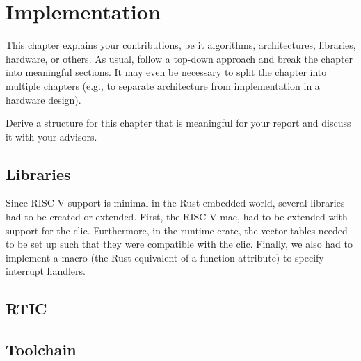 \chapter{Implementation}
\label{ch:implementation}

This chapter explains your contributions, be it algorithms, architectures, libraries, hardware, or others.
As usual, follow a top-down approach and break the chapter into meaningful sections.
It may even be necessary to split the chapter into multiple chapters (e.g., to separate architecture from implementation in a hardware design).

Derive a structure for this chapter that is meaningful for your report and discuss it with your advisors.

\section{Libraries}
\label{sec:libraries}
Since RISC-V support is minimal in the Rust embedded world, several libraries had to be created or extended.
First, the RISC-V \gls{mac}, had to be extended with support for the \gls{clic}. Furthermore, in the runtime crate, the vector tables needed to be set up such that they were compatible with the \gls{clic}. Finally, we also had to implement a macro (the Rust equivalent of a function attribute) to specify interrupt handlers.

\section{RTIC}

\section{Toolchain}

\section{}